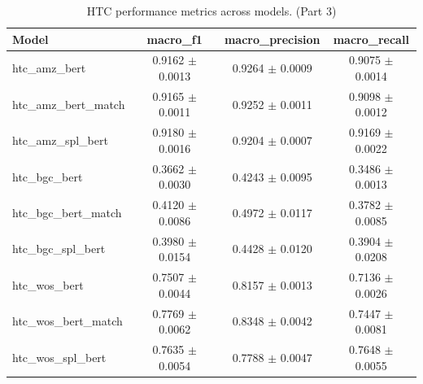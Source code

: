 \begin{table}[htbp]
\centering
\small
\begin{tabular}{lccc}
\toprule
Model & macro\_f1 & macro\_precision & macro\_recall \\
\midrule
htc\_amz\_bert & 0.9162 $\pm$ 0.0013 & 0.9264 $\pm$ 0.0009 & 0.9075 $\pm$ 0.0014 \\
htc\_amz\_bert\_match & 0.9165 $\pm$ 0.0011 & 0.9252 $\pm$ 0.0011 & 0.9098 $\pm$ 0.0012 \\
htc\_amz\_spl\_bert & 0.9180 $\pm$ 0.0016 & 0.9204 $\pm$ 0.0007 & 0.9169 $\pm$ 0.0022 \\
htc\_bgc\_bert & 0.3662 $\pm$ 0.0030 & 0.4243 $\pm$ 0.0095 & 0.3486 $\pm$ 0.0013 \\
htc\_bgc\_bert\_match & 0.4120 $\pm$ 0.0086 & 0.4972 $\pm$ 0.0117 & 0.3782 $\pm$ 0.0085 \\
htc\_bgc\_spl\_bert & 0.3980 $\pm$ 0.0154 & 0.4428 $\pm$ 0.0120 & 0.3904 $\pm$ 0.0208 \\
htc\_wos\_bert & 0.7507 $\pm$ 0.0044 & 0.8157 $\pm$ 0.0013 & 0.7136 $\pm$ 0.0026 \\
htc\_wos\_bert\_match & 0.7769 $\pm$ 0.0062 & 0.8348 $\pm$ 0.0042 & 0.7447 $\pm$ 0.0081 \\
htc\_wos\_spl\_bert & 0.7635 $\pm$ 0.0054 & 0.7788 $\pm$ 0.0047 & 0.7648 $\pm$ 0.0055 \\
\bottomrule
\end{tabular}
\caption{HTC performance metrics across models. (Part 3)}
\label{tab:htc_metrics_part3}
\end{table}